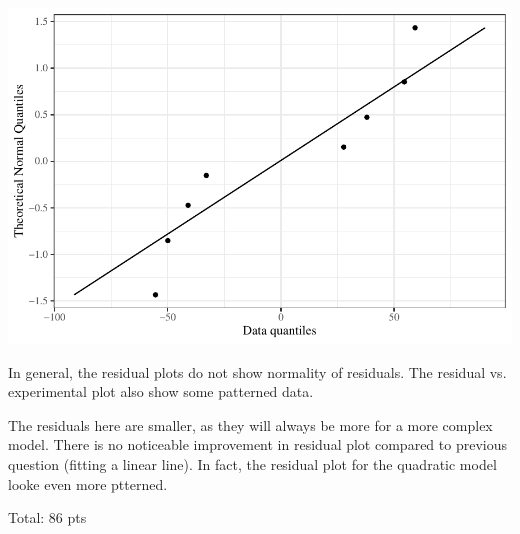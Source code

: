 \documentclass[11pt]{article}\usepackage[]{graphicx}\usepackage[]{color}
\begin{document}
\begin{enumerate}
\begin{enumerate}
\includegraphics{stat305-hw4_sol-010}

  In general, the residual plots do not show normality of residuals. The residual vs. experimental plot also show some patterned data.   
    
	 The residuals here are smaller, as they will always be more for a more complex model. There is no noticeable improvement in residual plot compared to previous question (fitting a linear line). In fact, the residual plot for the quadratic model looke even more ptterned. 
	 	  

  \end{enumerate}



\end{enumerate}	

Total: 86 pts
\end{document}
